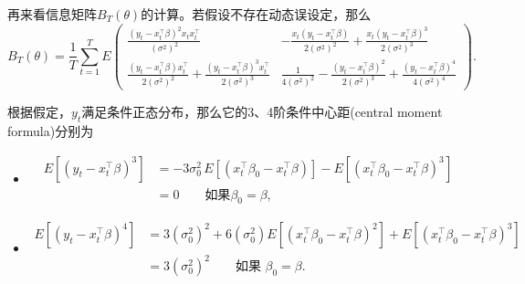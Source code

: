 再来看信息矩阵$B_{T} \left( \theta \right)$的计算。若假设不存在动态误设定，那么
\begin{equation}
    \label{eq:qmle-example-information}
    B_{T} \left( \theta \right)
    =\frac{1}{T} \sum_{t=1}^{T} E
    \begin{pmatrix}
        \frac{
        \left( y_{t} - x_{t}^{\top} \beta \right)^{2} x_{t} x_{t}^{\top}
        }{
        \left( \sigma^{2} \right)^{2}
        } &
        -\frac{
        x_{t} \left( y_{t} - x_{t}^{\top} \beta \right)
        }{
        2 \left( \sigma^{2} \right)^{2}
        }
        + \frac{
        x_{t} \left( y_{t} - x_{t}^{\top} \beta \right)^{3}
        }{
        2 \left( \sigma^{2} \right)^{3}
        } \\
        \frac{
        \left( y_{t} - x_{t}^{\top} \beta \right) x_{t}^{\top}
        }{
        2 \left( \sigma^{2} \right)^{2}
        }
        +
        \frac{
        \left( y_{t} - x_{t}^{\top} \beta \right)^{3} x_{t}^{\top}
        }{
        2 \left( \sigma^{2} \right)^{3}
        } &
        \frac{
        1
        }{
        4 \left( \sigma^{2} \right)^{2}
        }
        - \frac{
        \left( y_{t} - x_{t}^{\top} \beta \right)^{2}
        }{
        2 \left( \sigma^{2} \right)^{3}
        }
        + \frac{
        \left( y_{t} - x_{t}^{\top} \beta \right)^{4}
        }{
        4 \left( \sigma^{2} \right)^{4}
        }
    \end{pmatrix}.
\end{equation}

根据假定，$y_{t}$满足条件正态分布，那么它的3、4阶条件中心距(central moment formula)分别为
\begin{itemize}
\item
\begin{equation*}
    \begin{split}
        E \left[ \left( y_{t} - x_{t}^{\top} \beta \right)^{3} \right]
        & = - 3 \sigma_{0}^{2} \,
        E \left[
        \left(
        x_{t}^{\top} \beta_{0} - x_{t}^{\top} \beta
        \right)
        \right]
        - E
        \left[
        \left(
        x_{t}^{\top} \beta_{0} - x_{t}^{\top} \beta
        \right)^{3}
        \right] \\
        & = 0 \qquad \text{如果} \beta_{0} = \beta,
    \end{split}
\end{equation*}
\item
\begin{equation*}
\begin{split}
    E \left[ \left( y_{t} - x_{t}^{\top} \beta \right)^{4} \right]
    & = 3 \left( \sigma_{0}^{2} \right)^{2}
    + 6 \left( \sigma_{0}^{2} \right)
    E \left[
    \left(
    x_{t}^{\top} \beta_{0} - x_{t}^{\top} \beta
    \right)^{2}
    \right]
    + E \left[
    \left(
    x_{t}^{\top} \beta_{0} - x_{t}^{\top} \beta
    \right)^{3}
    \right] \\
    & = 3 \left( \sigma_{0}^{2} \right)^{2} \qquad \text{如果 } \beta_{0} = \beta.
\end{split}
\end{equation*}
\end{itemize}

